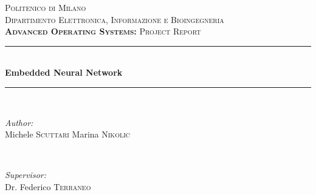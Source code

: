 \begin{titlepage}

\newcommand{\HRule}{\rule{\linewidth}{0.5mm}} %


\center %
 

\textsc{\LARGE Politenico di Milano}\\[1.5cm] %
\textsc{\Large Dipartimento Elettronica, Informazione e Bioingegneria}\\[0.5cm] %
\textsc{\large \textbf{Advanced Operating Systems:} Project Report}\\[0.5cm] %


\HRule \\[0.4cm]
{ \huge \bfseries Embedded Neural Network}\\[0.4cm] %
\HRule \\[1.5cm]
 

\begin{minipage}{0.4\textwidth}
\begin{flushleft} \large
\emph{Author:}\\
Michele \textsc{Scuttari}
Marina \textsc{Nikolic} %
\end{flushleft}
\end{minipage}
~
\begin{minipage}{0.4\textwidth}
\begin{flushright} \large
\emph{Supervisor:} \\
Dr. Federico \textsc{Terraneo} %
\end{flushright}
\end{minipage}\\[1.5cm]


\end{titlepage}
